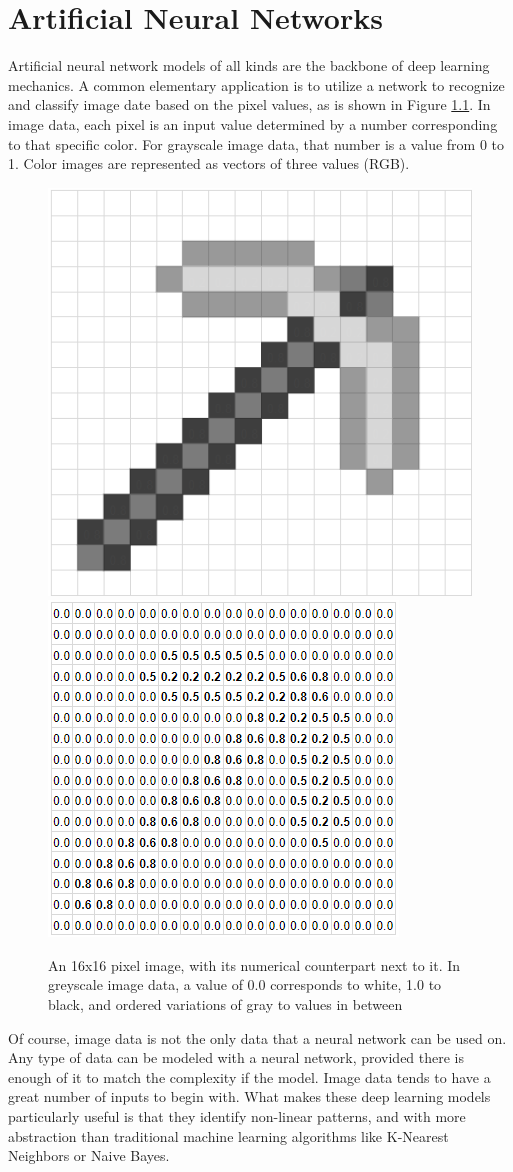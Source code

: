 \chapter{Artificial Neural Networks}



Artificial neural network models of all kinds are the backbone of deep learning mechanics.  A common elementary application is to utilize a network to recognize and classify image date based on the pixel values, as is shown in Figure \ref{minecraft}.  In image data, each pixel is an input value determined by a number corresponding to that specific color.  For grayscale image data, that number is a value from 0 to 1.  Color images are represented as vectors of three values (RGB).

\begin{figure}[H]
    \centering
    \includegraphics[width=.35\textwidth]{Figures/pickaxe_1.png}
    \hspace{30pt}
    \includegraphics[width=.35\textwidth]{Figures/pickaxe_2.png}
    \caption{\footnotesize{An 16x16 pixel image, with its numerical counterpart next to it.  In greyscale image data, a value of 0.0 corresponds to white, 1.0 to black, and ordered variations of gray to values in between}}
    \label{minecraft}
\end{figure}

Of course, image data is not the only data that a neural network can be used on.  Any type of data can be modeled with a neural network, provided there is enough of it to match the complexity if the model.  Image data tends to have a great number of inputs to begin with.  What makes these deep learning models particularly useful is that they identify non-linear patterns, and with more abstraction than traditional machine learning algorithms like K-Nearest Neighbors or Naive Bayes.



